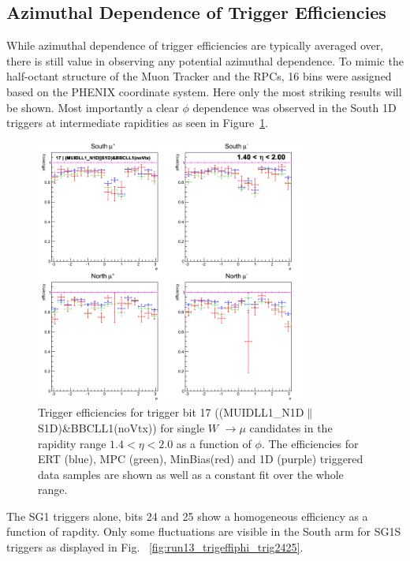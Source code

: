 \subsection{Azimuthal Dependence of Trigger Efficiencies}

While azimuthal dependence of trigger efficiencies are typically averaged over,
there is still value in observing any potential azimuthal dependence. To mimic
the half-octant structure of the Muon Tracker and the RPCs, 16 bins were
assigned based on the PHENIX coordinate system. Here only the most striking
results will be shown. Most importantly a clear $\phi$ dependence was observed
in the South 1D triggers at intermediate rapidities as seen in
Figure~\ref{fig:run13_trigeffiphi_trig17}. 

\begin{figure}[ht]
  \centering
  \includegraphics[width=0.8\textwidth]{./figures/run13_trigeffiphi_eta1_trig17_lin.png}
  \caption{
    Trigger efficiencies for trigger bit 17
    ((MUIDLL1\_N1D$\|$S1D)\&BBCLL1(noVtx)) for single $W$ $\rightarrow \mu$
    candidates in the rapidity range $ 1.4 < \eta < 2.0$ as a function of
    $\phi$. The efficiencies for ERT (blue), MPC (green), MinBias(red) and 1D
    (purple) triggered data samples are shown as well as a constant fit over the
    whole range.
  }
  \label{fig:run13_trigeffiphi_trig17} 
\end{figure}

\clearpage

The SG1 triggers alone, bits 24 and 25 show a homogeneous efficiency as a
function of rapdity. Only some fluctuations are visible in the South arm for
SG1S triggers as displayed in Fig.~ \ref{fig:run13_trigeffiphi_trig2425}.  


